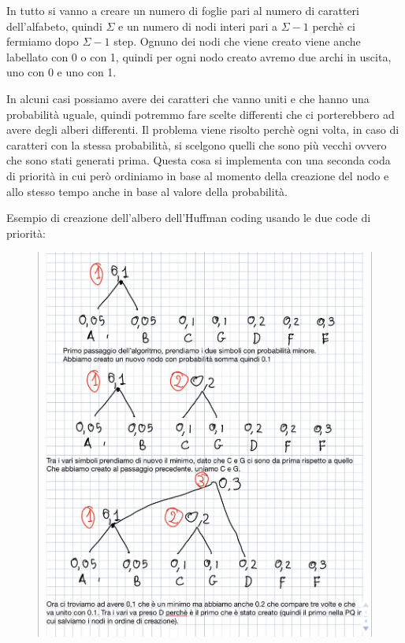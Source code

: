 \documentclass[14pt]{extreport}
\begin{document}
In tutto si vanno a creare un numero di foglie pari al numero di caratteri dell'alfabeto, quindi $\Sigma$ e un numero di nodi interi pari a $\Sigma-1$ perchè ci fermiamo dopo $\Sigma-1$ step.
Ognuno dei nodi che viene creato viene anche labellato con 0 o con 1, quindi per ogni nodo creato avremo due archi in uscita, uno con 0 e uno con 1.

In alcuni casi possiamo avere dei caratteri che vanno uniti e che hanno una probabilità uguale, quindi potremmo fare scelte differenti che ci porterebbero ad avere degli alberi differenti.
Il problema viene risolto perchè ogni volta, in caso di caratteri con la stessa probabilità, si scelgono quelli che sono più vecchi ovvero che sono stati generati prima. Questa cosa si implementa con una seconda coda di priorità in cui però ordiniamo in base al momento della creazione del nodo e allo stesso tempo anche in base al valore della probabilità.

Esempio di creazione dell'albero dell'Huffman coding usando le due code di priorità:

\begin{figure}[H]
\centering
  \includegraphics[width=\linewidth]{IMG_0168.jpg}

\end{figure}
\end{document}
